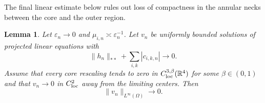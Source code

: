 \documentclass[11pt]{article}
\newtheorem{lemma}[theorem]{Lemma}
\numberwithin{equation}{section}
\begin{document}
The final linear estimate below rules out loss of compactness in the
annular necks between the core and the outer region.

\begin{lemma}\label{lem:remove-defects}
Let $\varepsilon_n\to0$ and
$\mu_{i,n}\asymp\varepsilon_n^{-1}$. Let $v_n$ be uniformly bounded
solutions of projected linear equations with
\begin{equation*}
\|h_n\|_{**}+\sum_{i,k}|c_{i,k,n}|\longrightarrow0.
\end{equation*}
Assume that every core rescaling tends to zero in
$C^{3,\beta}_{\rm loc}(\mathbb R^4)$ for some $\beta\in(0,1)$ and
that $v_n\to0$ in $C^2_{\rm loc}$ away from the limiting centers.
Then
\begin{equation}\label{eq:neck-conclusion}
\|v_n\|_{L^\infty(\Omega)}\longrightarrow0.
\end{equation}
\end{lemma}
\end{document}
